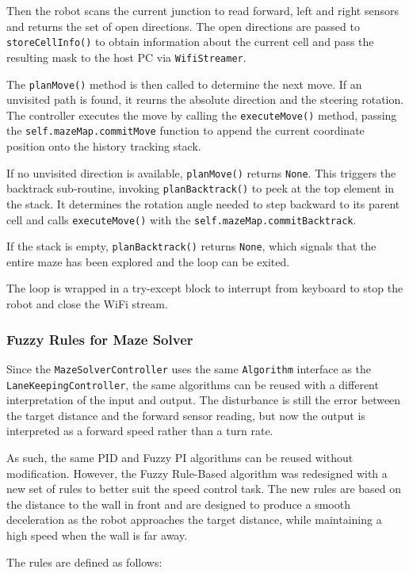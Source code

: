 Then the robot scans the current junction to read forward, left and right sensors and returns the set of open directions. The open directions are passed to \texttt{storeCellInfo()} to obtain information about the current cell and pass the resulting mask to the host PC via \texttt{WifiStreamer}. 

The \texttt{planMove()} method is then called to determine the next move. If an unvisited path is found, it reurns the absolute direction and the steering rotation. The controller executes the move by calling the \texttt{executeMove()} method, passing the \texttt{self.mazeMap.commitMove} function to append the current coordinate position onto the history tracking stack.

If no unvisited direction is available, \texttt{planMove()} returns \texttt{None}. This triggers the backtrack sub-routine, invoking \texttt{planBacktrack()} to peek at the top element in the stack. It determines the rotation angle needed to step backward to its parent cell and calls \texttt{executeMove()} with the \texttt{self.mazeMap.commitBacktrack}. 

If the stack is empty, \texttt{planBacktrack()} returns \texttt{None}, which signals that the entire maze has been explored and the loop can be exited.

The loop is wrapped in a try-except block to interrupt from keyboard to stop the robot and close the WiFi stream.

\subsubsection{Fuzzy Rules for Maze Solver}
Since the \texttt{MazeSolverController} uses the same \texttt{Algorithm} interface as the \texttt{LaneKeepingController}, the same algorithms can be reused with a different interpretation of the input and output. The disturbance is still the error between the target distance and the forward sensor reading, but now the output is interpreted as a forward speed rather than a turn rate.

As such, the same PID and Fuzzy PI algorithms can be reused without modification. However, the Fuzzy Rule-Based algorithm was redesigned with a new set of rules to better suit the speed control task. The new rules are based on the distance to the wall in front and are designed to produce a smooth deceleration as the robot approaches the target distance, while maintaining a high speed when the wall is far away.

The rules are defined as follows:


